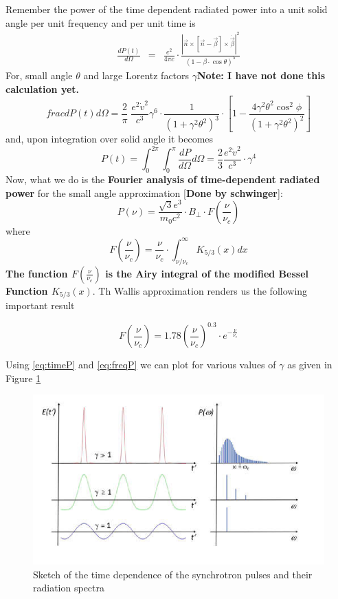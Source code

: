 \documentclass[12pt]{report}
\newcommand{\tbf}[1]{\textbf{#1}}
\newcommand{\de}[2]{\frac{d{#1}}{d{#2}}}
\newcommand{\cbox}{tcolorbox}
\newcommand{\cc}[1]{\left({#1}\right)}
\newcommand{\rr}[1]{\left[{#1}\right]}
\newcommand{\vd}[1]{\dot{\vec{#1}}}
\begin{document}
Remember the power of the time dependent radiated power into a unit solid angle per unit frequency and per unit time is
\begin{align}
\frac{dP(t)}{d\Omega}&=&\frac{e^2}{4 \pi c}\cdot \frac{|\vec{n}\times\rr{\vec{n}-\vec{\beta}}\times\vd{\beta}|^2}{(1-\beta \cdot \cos \theta)^5}
\end{align}
For, small angle $\theta$ and large Lorentz factors $\gamma$\textbf{Note: I have not done this calculation yet.}
\begin{equation}
frac{dP(t)}{d\Omega}=\frac{2}{\pi}\;\frac{e^2 \dot{v}^2}{c^3} \gamma^6\cdot \frac{1}{(1+\gamma^2 \theta^2)^3}\cdot \rr{1-\frac{4 \gamma^2 \theta^2 \cos^2 \phi}{(1+\gamma^2\theta^2)^2}}
\end{equation}
and, upon integration over solid angle it becomes
\begin{equation}\label{eq:timeP}
P(t)=\int^{2 \pi}_0 \int^{\pi}_0 \de{P}{\Omega}d\Omega=\frac{2}{3}\frac{e^2\dot{v}^2}{c^3}\cdot\gamma^4
\end{equation}
Now, what we do is the \tbf{Fourier analysis of time-dependent radiated power} for the small angle approximation [\textbf{Done by schwinger}]:
\begin{equation}
P(\nu)=\frac{\sqrt{3}e^3}{m_0 c^2} \cdot B_{\perp} \cdot F\cc{\frac{\nu}{\nu_c}}
\end{equation}
where
\begin{equation}\label{eq:freqP}
F\cc{\frac{\nu}{\nu_c}}=\frac{\nu}{\nu_c}\cdot \int^\infty_{\nu/\nu_c} K_{5/3}(x)dx
\end{equation}
\textbf{The function $F\cc{\frac{\nu}{\nu_c}}$ is the Airy integral of the modified Bessel Function $K_{5/3}(x)$}. Th Wallis approximation renders us the following important result
\begin{\cbox}

\begin{equation}
F\cc{\frac{\nu}{\nu_c}}=1.78 \cc{\frac{\nu}{\nu_c}}^{0.3} \cdot e^{-\frac{\nu}{\nu_c}} 
\end{equation}
\end{\cbox}
Using \eqref{eq:timeP} and \eqref{eq:freqP} we can plot for various values of $\gamma$ as given in Figure \ref{figfour}

\begin{figure}\label{figfour}
\includegraphics[scale=1]{figfour.png}
\caption{Sketch of the time dependence of the synchrotron pulses and their radiation spectra}
\end{figure}
\end{document}

